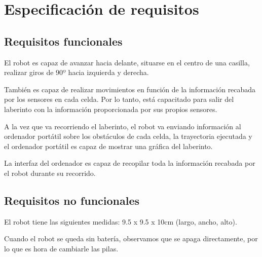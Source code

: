 \chapter{Especificación de requisitos}
\section{Requisitos funcionales}
El robot es capaz de avanzar hacia delante, situarse en el centro de una casilla, realizar giros de $90º$ hacia izquierda y derecha.

También es capaz de realizar movimientos en función de la información recabada por los sensores en cada celda. Por lo tanto, está capacitado para salir del laberinto con la información proporcionada por sus propios sensores.

A la vez que va recorriendo el laberinto, el robot va enviando información al ordenador portátil sobre los obstáculos de cada celda, la trayectoria ejecutada y el ordenador portátil es capaz de mostrar una gráfica del laberinto.

La interfaz del ordenador es capaz de recopilar toda la información recabada por el robot durante su recorrido.

\section{Requisitos no funcionales}
El robot tiene las siguientes medidas: 9.5 x 9.5 x 10cm (largo, ancho, alto).

Cuando el robot se queda sin batería, observamos que se apaga directamente, por lo que es hora de cambiarle las pilas.